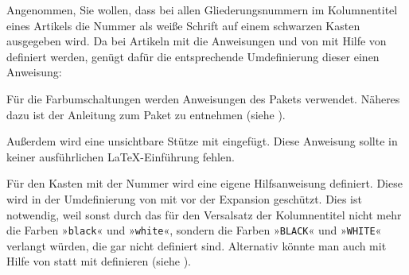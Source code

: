     \begin{Example}
      Angenommen, Sie wollen, dass bei allen Gliederungsnummern im
      Kolumnentitel eines Artikels die Nummer als weiße Schrift auf einem
      schwarzen Kasten ausgegeben wird. Da bei Artikeln mit 
      die Anweisungen %
       und
       von  mit Hilfe von
       definiert werden, genügt dafür die
      entsprechende Umdefinierung dieser einen Anweisung:
      Für die Farbumschaltungen werden Anweisungen des Pakets
       verwendet. Näheres dazu ist der
      Anleitung zum Paket zu entnehmen (siehe \cite{package:xcolor}). 

      Außerdem wird eine unsichtbare Stütze mit  eingefügt. Diese
      Anweisung sollte in keiner ausführlichen \LaTeX-Einführung fehlen.

      Für den Kasten mit der Nummer wird eine eigene Hilfsanweisung
       definiert. Diese wird in der Umdefinierung von
       mit
       vor der
      Expansion geschützt. Dies ist notwendig, weil sonst durch das
       für den Versalsatz der Kolumnentitel
      nicht mehr die Farben »\texttt{black}« und »\texttt{white}«, sondern die
      Farben »\texttt{BLACK}« und »\texttt{WHITE}« verlangt würden, die gar
      nicht definiert sind. Alternativ könnte man  auch mit
      Hilfe von  statt mit 
      definieren (siehe \cite{latex:clsguide}).


\end{Example}
